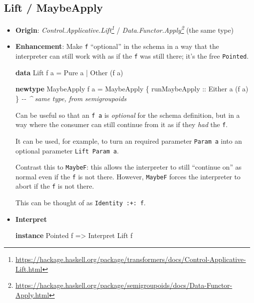 \documentclass[]{article}
\newenvironment{Shaded}{}{}
\newcommand{\CommentTok}[1]{\textcolor[rgb]{0.38,0.63,0.69}{\textit{#1}}}
\newcommand{\DataTypeTok}[1]{\textcolor[rgb]{0.56,0.13,0.00}{#1}}
\newcommand{\KeywordTok}[1]{\textcolor[rgb]{0.00,0.44,0.13}{\textbf{#1}}}
\newcommand{\NormalTok}[1]{#1}
\newcommand{\OperatorTok}[1]{\textcolor[rgb]{0.40,0.40,0.40}{#1}}
\newcommand{\OtherTok}[1]{\textcolor[rgb]{0.00,0.44,0.13}{#1}}
\renewcommand{\href}[2]{#2\footnote{\url{#1}}}
\begin{document}
\subsection{Lift / MaybeApply}\label{lift-maybeapply}

\begin{itemize}
\item
  \textbf{Origin}:
  \emph{\href{https://hackage.haskell.org/package/transformers/docs/Control-Applicative-Lift.html}{Control.Applicative.Lift}}
  /
  \emph{\href{https://hackage.haskell.org/package/semigroupoids/docs/Data-Functor-Apply.html}{Data.Functor.Apply}}
  (the same type)
\item
  \textbf{Enhancement}: Make \texttt{f} ``optional'' in the schema in a way that
  the interpreter can still work with as if the \texttt{f} was still there; it's
  the free \texttt{Pointed}.

\begin{Shaded}
\begin{Highlighting}[]
\KeywordTok{data} \DataTypeTok{Lift}\NormalTok{ f a }\OtherTok{=} \DataTypeTok{Pure}\NormalTok{  a}
              \OperatorTok{|} \DataTypeTok{Other}\NormalTok{ (f a)}

\KeywordTok{newtype} \DataTypeTok{MaybeApply}\NormalTok{ f a }\OtherTok{=} \DataTypeTok{MaybeApply}\NormalTok{ \{}\OtherTok{ runMaybeApply ::} \DataTypeTok{Either}\NormalTok{ a (f a) \}}
    \CommentTok{{-}{-} \^{} same type, from semigroupoids}
\end{Highlighting}
\end{Shaded}

  Can be useful so that an \texttt{f\ a} is \emph{optional} for the schema
  definition, but in a way where the consumer can still continue from it as if
  they \emph{had} the \texttt{f}.

  It can be used, for example, to turn an required parameter \texttt{Param\ a}
  into an optional parameter \texttt{Lift\ Param\ a}.

  Contrast this to \texttt{MaybeF}: this allows the interpreter to still
  ``continue on'' as normal even if the \texttt{f} is not there. However,
  \texttt{MaybeF} forces the interpreter to abort if the \texttt{f} is not
  there.

  This can be thought of as \texttt{Identity\ :+:\ f}.
\item
  \textbf{Interpret}

\begin{Shaded}
\begin{Highlighting}[]
\KeywordTok{instance} \DataTypeTok{Pointed}\NormalTok{ f }\OtherTok{=\textgreater{}} \DataTypeTok{Interpret} \DataTypeTok{Lift}\NormalTok{ f}


\end{Highlighting}
\end{Shaded}
\end{itemize}
\end{document}
